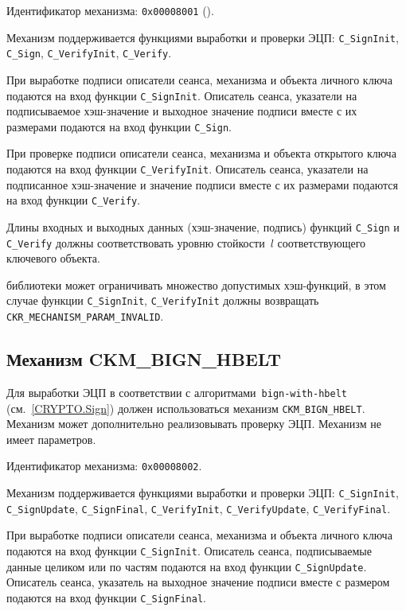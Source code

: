 Идентификатор механизма: \texttt{0x00008001} 
(). 

Механизм поддерживается функциями выработки и проверки ЭЦП: 
\verb|C_SignInit|, \verb|C_Sign|, \verb|C_VerifyInit|, \verb|C_Verify|.

При выработке подписи описатели сеанса, механизма и объекта
личного ключа подаются на вход функции \verb|C_SignInit|.
Описатель сеанса, указатели на подписываемое хэш-значение и выходное значение подписи
вместе с их размерами подаются на вход функции \verb|C_Sign|.

При проверке подписи описатели сеанса, механизма и объекта
открытого ключа подаются на вход функции \verb|C_VerifyInit|.
Описатель сеанса, указатели на подписанное хэш-значение и значение подписи
вместе с их размерами подаются на вход функции \verb|C_Verify|.

Длины входных и выходных данных (хэш-значение, подпись) функций
\verb|C_Sign| и \verb|C_Verify| должны соответствовать
уровню стойкости~$l$ соответствующего ключевого объекта.


 библиотеки может ограничивать множество
допустимых хэш-функций, в этом случае функции \verb|C_SignInit|,
\verb|C_VerifyInit| должны возвращать \verb|CKR_MECHANISM_PARAM_INVALID|.

\subsection{Механизм CKM\_BIGN\_HBELT}

Для выработки ЭЦП в соответствии с алгоритмами~\texttt{bign-with-hbelt} 
(см.~\ref{CRYPTO.Sign}) должен использоваться механизм \verb|CKM_BIGN_HBELT|. 
Механизм может дополнительно реализовывать проверку ЭЦП. 
%
Механизм не имеет параметров.

Идентификатор механизма: \texttt{0x00008002}.

Механизм поддерживается функциями выработки и проверки ЭЦП: 
\verb|C_SignInit|, \verb|C_SignUpdate|, \verb|C_SignFinal|, 
\verb|C_VerifyInit|, \verb|C_VerifyUpdate|, \verb|C_VerifyFinal|.

При выработке подписи описатели сеанса, механизма и объекта
личного ключа подаются на вход функции \verb|C_SignInit|.
Описатель сеанса, подписываемые данные целиком или по частям подаются
на вход функции \verb|C_SignUpdate|.
Описатель сеанса, указатель на выходное значение подписи вместе с размером
подаются на вход функции \verb|C_SignFinal|.

